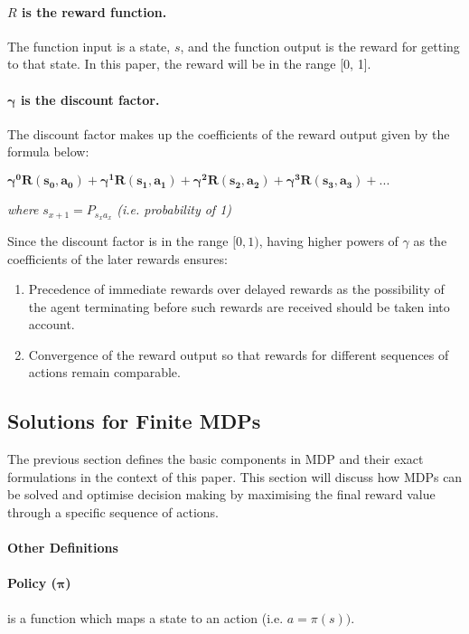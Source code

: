 \documentclass{article}
\begin{document}
\paragraph{$ R $ is the reward function.} The function input is a state, $ s $, and the function output is the reward for getting to that state. In this paper, the reward will be in the range [0, 1].

\paragraph{$ \boldsymbol{\gamma} $ is the discount factor.} The discount factor makes up the coefficients of the reward output given by the formula below:
\medskip

$ \boldsymbol{\gamma^0 R(s_0, a_0) + \gamma^1 R(s_1, a_1) + \gamma^2 R(s_2, a_2) + \gamma^3 R(s_3, a_3) + ...} $
\medskip

\textit{where} $ s_{x+1} = P_{s_xa_x} $ \textit{(i.e. probability of 1)}
\medskip

Since the discount factor is in the range $ [0, 1) $, having higher powers of $ \gamma $ as the coefficients of the later rewards ensures:
\begin{enumerate}
	\item Precedence of immediate rewards over delayed rewards \cite{bib-09} as the possibility of the agent terminating before such rewards are received should be taken into account.
	\item Convergence of the reward output so that rewards for different sequences of actions remain comparable.
\end{enumerate}
\newpage

\subsection{Solutions for Finite MDPs}
The previous section defines the basic components in MDP and their exact formulations in the context of this paper. This section will discuss how MDPs can be solved and optimise decision making by maximising the final reward value through a specific sequence of actions.

\paragraph{Other Definitions}
\paragraph{Policy ($ \boldsymbol{\pi} $)} is a function which maps a state to an action (i.e. $ a = \pi(s)) $.
\end{document}
